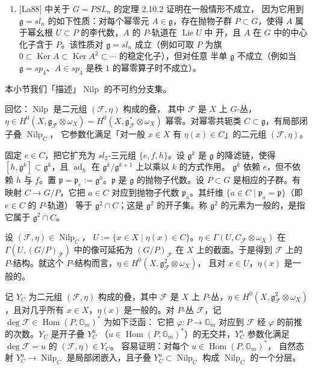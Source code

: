 \begin{enumerate}[label=(\roman*),leftmargin=2.6em]
  定理 2.10.2（见 [Gi97] 的 §§6.5）。Faltings 对定理 2.10.2 的证明
  也很漂亮且简短（见 [Fal93] 定理 II.5 证明的前两段）。
\item {}[La88] 中关于 $G=PSL_n$ 的定理 2.10.2 证明在一般情形不成立，
  因为它用到 $\mathfrak{g}=sl_n$ 的如下性质：对每个幂零元
  $A\in\mathfrak{g}$，存在抛物子群 $P\subset G$，使得 $A$ 属于幂幺根
  $U\subset P$ 的李代数，$A$ 的 $P$-轨道在 $\operatorname{Lie}U$ 中
  开，且 $A$ 在 $G$ 中的中心化子含于 $P$。该性质对 $\mathfrak{g}=sl_n$
  成立（例如可取 $P$ 为旗 $0\subset\operatorname{Ker}A
  \subset\operatorname{Ker}A^2\subset\cdots$ 的稳定化子），但对任意
  半单 $\mathfrak{g}$ 不成立（例如当 $\mathfrak{g}=sp_4$、$A\in sp_4$
  是秩 $1$ 的幂零算子时不成立）。
\end{enumerate}

 本小节我们「描述」$\operatorname{Nilp}$ 的不可约分支集。

回忆：$\operatorname{Nilp}$ 是二元组 $(\mathcal{F},\eta)$ 构成的叠，
其中 $\mathcal{F}$ 是 $X$ 上 $G$-丛，
$\eta\in H^0(X,\mathfrak{g}_{\mathcal{F}}\otimes\omega_X)
=H^0(X,\mathfrak{g}^{*}_{\mathcal{F}}\otimes\omega_X)$ 幂零。对幂零共轭类
$C\subset\mathfrak{g}$，有局部闭子叠 $\operatorname{Nilp}_C$，
它参数化满足「对一般 $x\in X$ 有 $\eta(x)\in C$」的二元组
$(\mathcal{F},\eta)$。

固定 $e\in C$，把它扩充为 $sl_2$-三元组 $\{e,f,h\}$。设
$\mathfrak{g}^k$ 是 $\mathfrak{g}$ 的降滤链，使得
$[h,\mathfrak{g}^k]\subset\mathfrak{g}^k$，且 $\operatorname{ad}_h$
在 $\mathfrak{g}^k/\mathfrak{g}^{k+1}$ 上以乘以 $k$ 的方式作用。
$\mathfrak{g}^k$ 依赖 $e$，但不依赖 $h$ 与 $f$。置
$\mathfrak{p}=\mathfrak{p}_e:=\mathfrak{g}^0$。$\mathfrak{p}$ 是
$\mathfrak{g}$ 的抛物子代数。设 $P\subset G$ 是相应的子群。有映射
$C\to G/P$，它把 $a\in C$ 对应到抛物子代数 $\mathfrak{p}_a$。其纤维
$\{a\in C\mid\mathfrak{p}_a=\mathfrak{p}\}$（即 $e\in C$ 的 $P$-轨道）
等于 $\mathfrak{g}^2\cap C$；这是 $\mathfrak{g}^2$ 的开子集。称
$\mathfrak{g}^2$ 的元素为一般的，是指它属于 $\mathfrak{g}^2\cap C$。


设 $(\mathcal{F},\eta)\in\operatorname{Nilp}_C$，
$U:=\{x\in X\mid\eta(x)\in C\}$。$\eta\in
\Gamma(U,C_{\mathcal{F}}\otimes\omega_X)$ 在
$\Gamma(U,(G/P)_{\mathcal{F}})$ 中的像可延拓为 $(G/P)_{\mathcal{F}}$
在 $X$ 上的截面。于是得到 $\mathcal{F}$ 上的 $P$-结构。就这个
$P$-结构而言，$\eta\in H^0(X,\mathfrak{g}^2_{\mathcal{F}}\otimes\omega_X)$，
且对 $x\in U$，$\eta(x)$ 是一般的。

记 $Y_C$ 为二元组 $(\mathcal{F},\eta)$ 构成的叠，其中 $\mathcal{F}$
是 $X$ 上 $P$-丛，$\eta\in
H^0(X,\mathfrak{g}^2_{\mathcal{F}}\otimes\omega_X)$，且对几乎所有
$x\in X$，$\eta(x)$ 是一般的。对 $P$-丛 $\mathcal{F}$，记
$\deg\mathcal{F}\in\operatorname{Hom}(P,\mathbb{G}_m)^*$ 为如下泛函：
它把 $\varphi:P\to\mathbb{G}_m$ 对应到 $\mathcal{F}$ 经 $\varphi$
的前推的次数。$Y_C$ 是开子叠 $Y_C^u$
（$u\in\operatorname{Hom}(P,\mathbb{G}_m)^*$）的无交并，$Y_C^u$
参数化满足 $\deg\mathcal{F}=u$ 的 $(\mathcal{F},\eta)\in Y_C$。
容易证明：对每个 $u\in\operatorname{Hom}(P,\mathbb{G}_m)^*$，
自然态射 $Y_C^u\to\operatorname{Nilp}_C$ 是局部闭嵌入，且子叠
$Y_C^u\subset\operatorname{Nilp}_C$ 构成 $\operatorname{Nilp}_C$
的一个分层。

